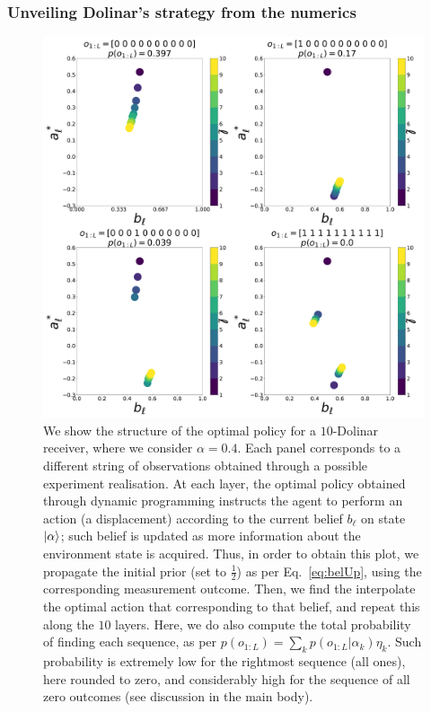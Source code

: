 \subsubsection{Unveiling Dolinar's strategy from the numerics}
\begin{figure}[t!]
    \centering
    \includegraphics[width=1.\textwidth]{Figures/strat_dolinar.pdf}
    \caption{\small{We show the structure of the optimal policy for a $10$-Dolinar receiver, where we consider $\alpha=0.4$. Each panel corresponds to a different string of observations obtained through a possible experiment realisation. At each layer, the optimal policy obtained through dynamic programming instructs the agent to perform an action (a displacement) according to the current belief $b_\ell$ on state $\ket{\alpha}$; such belief is updated as more information about the environment state is acquired. Thus, in order to obtain this plot, we propagate the initial prior (set to $\frac{1}{2}$) as per Eq.~\ref{eq:belUp}, using the corresponding measurement outcome. Then, we find the interpolate the optimal action that corresponding to that belief, and repeat this along the $10$ layers. Here, we do also compute the total probability of finding each sequence, as per $p(o_{1:L}) = \sum_k p(o_{1:L}|\alpha_k)\eta_k$. Such probability is extremely low for the rightmost sequence (all ones), here rounded to zero, and considerably high for the sequence of all zero outcomes (see discussion in the main body).}}
    \label{fig:strategy_dp}
\end{figure}
\afterpage{\clearpage}

